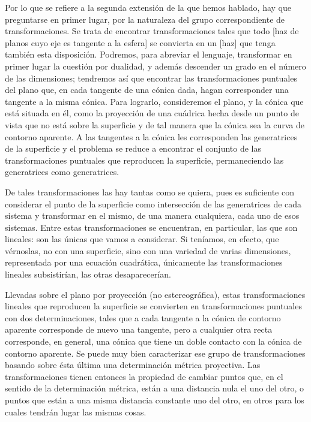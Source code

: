 \documentclass[a4paper, 12pt]{article}
\begin{document}
Por lo que se refiere a la segunda extensión de la que hemos hablado, hay que preguntarse en primer lugar, por la naturaleza del grupo correspondiente de transformaciones. Se trata de encontrar transformaciones tales que todo [haz de planos cuyo eje es tangente a la esfera] se convierta en un [haz] que tenga también esta disposición. Podremos, para abreviar el lenguaje, transformar en primer lugar la cuestión por dualidad, y además descender un grado en el número de las dimensiones; tendremos así que encontrar las transformaciones puntuales del plano que, en cada tangente de una cónica dada, hagan corresponder una tangente a la misma cónica. Para lograrlo, consideremos el plano, y la cónica que está situada en él, como la proyección de una cuádrica hecha desde un punto de vista que no está sobre la superficie y de tal manera que la cónica sea la curva de contorno aparente. A las tangentes a la cónica les corresponden las generatrices de la superficie y el problema se reduce a encontrar el conjunto de las transformaciones puntuales que reproducen la superficie, permaneciendo las generatrices como generatrices.

De tales transformaciones las hay tantas como se quiera, pues es suficiente con considerar el punto de la superficie como intersección de las generatrices de cada sistema y transformar en el mismo, de una manera cualquiera, cada uno de esos sistemas. Entre estas transformaciones se encuentran, en particular, las que son lineales: son las únicas que vamos a considerar. Si teníamos, en efecto, que vérnoslas, no con una superficie, sino con una variedad de varias dimensiones, representada por una ecuación cuadrática, únicamente las transformaciones lineales subsistirían, las otras desaparecerían.

Llevadas sobre el plano por proyección (no estereográfica), estas transformaciones lineales que reproducen la superficie se convierten en transformaciones puntuales con dos determinaciones, tales que a cada tangente a la cónica de contorno aparente corresponde de nuevo una tangente, pero a cualquier otra recta corresponde, en general, una cónica que tiene un doble contacto con la cónica de contorno aparente. Se puede muy bien caracterizar ese grupo de transformaciones basando sobre ésta última una determinación métrica proyectiva. Las transformaciones tienen entonces la propiedad de cambiar puntos que, en el sentido de la determinación métrica, están a una distancia nula el uno del otro, o puntos que están a una misma distancia constante uno del otro, en otros para los cuales tendrán lugar las mismas cosas.
\end{document}
